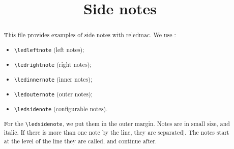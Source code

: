 \documentclass{article}
\begin{document}
\begin{english}
\date{}
\title{Side notes}
\maketitle
\begin{abstract}
This file provides examples of side notes with reledmac. 
We use :
\begin{itemize}
  \item \verb+\ledleftnote+ (left notes); 
  \item \verb+\ledrightnote+ (right notes); 
  \item \verb+\ledinnernote+ (inner notes); 
  \item \verb+\ledouternote+ (outer notes); 
  \item \verb+\ledsidenote+ (configurable notes).
\end{itemize}

For the \verb+\ledsidenote+, we put them in the outer margin.
Notes are in small size, and italic. If there is more than one note by the line, they are separated$ | $. The notes start at the level of the line they are called, and continue after.
\end{abstract}
\end{english}
\end{document}
